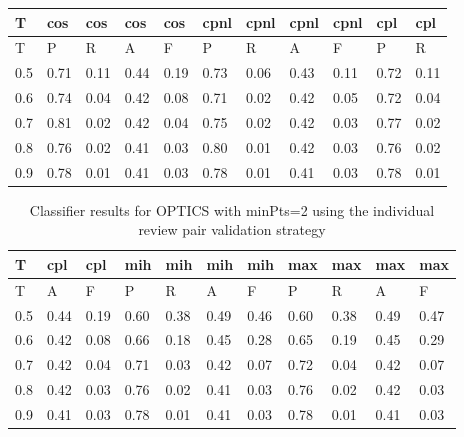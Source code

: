 \begin{center}
\begin{table}[!h]
\centering
\begin{tabular}{|l|l|l|l|l|l|l|l|l|l|l|}
  \hline
T & cos & cos & cos & cos & cpnl & cpnl & cpnl & cpnl & cpl & cpl \\ 
  \hline
T & P & R & A & F & P & R & A & F & P & R \\ 
   \hline
0.5 & 0.71 & 0.11 & 0.44 & 0.19 & 0.73 & 0.06 & 0.43 & 0.11 & 0.72 & 0.11 \\ 
  0.6 & 0.74 & 0.04 & 0.42 & 0.08 & 0.71 & 0.02 & 0.42 & 0.05 & 0.72 & 0.04 \\ 
  0.7 & 0.81 & 0.02 & 0.42 & 0.04 & 0.75 & 0.02 & 0.42 & 0.03 & 0.77 & 0.02 \\ 
  0.8 & 0.76 & 0.02 & 0.41 & 0.03 & 0.80 & 0.01 & 0.42 & 0.03 & 0.76 & 0.02 \\ 
  0.9 & 0.78 & 0.01 & 0.41 & 0.03 & 0.78 & 0.01 & 0.41 & 0.03 & 0.78 & 0.01 \\ 
   \hline
\end{tabular}
\end{table}
\begin{table}[!h]
\centering
\begin{tabular}{|l|l|l|l|l|l|l|l|l|l|l|}
  \hline
T & cpl & cpl & mih & mih & mih & mih & max & max & max & max \\ 
  \hline
T & A & F & P & R & A & F & P & R & A & F \\ 
   \hline
0.5 & 0.44 & 0.19 & 0.60 & 0.38 & 0.49 & 0.46 & 0.60 & 0.38 & 0.49 & 0.47 \\ 
  0.6 & 0.42 & 0.08 & 0.66 & 0.18 & 0.45 & 0.28 & 0.65 & 0.19 & 0.45 & 0.29 \\ 
  0.7 & 0.42 & 0.04 & 0.71 & 0.03 & 0.42 & 0.07 & 0.72 & 0.04 & 0.42 & 0.07 \\ 
  0.8 & 0.42 & 0.03 & 0.76 & 0.02 & 0.41 & 0.03 & 0.76 & 0.02 & 0.42 & 0.03 \\ 
  0.9 & 0.41 & 0.03 & 0.78 & 0.01 & 0.41 & 0.03 & 0.78 & 0.01 & 0.41 & 0.03 \\ 
   \hline
\end{tabular}
\caption{Classifier results for OPTICS with minPts=2 using the individual review pair validation strategy} 
\label{tab:optics-minpts-2-individual}
\end{table}\end{center}

